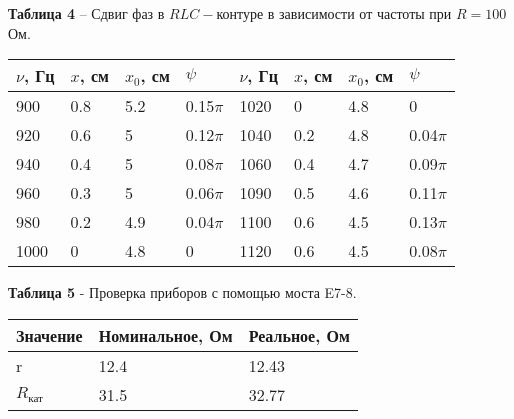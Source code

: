 \documentclass[12pt,a4paper]{article}
\begin{document}
\begin{itemize}
            \begin{table}[!h]
            \begin{flushleft}
           		\hspace{20}\textbf{Таблица 4} --  Сдвиг фаз в $RLC-$контуре в зависимости от частоты при $R = 100$ Ом.\\
            \end{flushleft}
                \begin{center}
                    \begin{tabular}{ | l | l | l | l | l | l | l | l |}
                        \hline
                        $\nu$, Гц   &   $x$, см &  $x_0$, см&   $\psi$  &   $\nu$, Гц   &   $x$, см &  $x_0$, см    &   $\psi$  \\
                        \hline
                        900     &   0.8 &   5.2 &   0.15$\pi$   &   1020    &   0   &   4.8 &   0           \\
                        920     &   0.6 &   5   &   0.12$\pi$   &   1040    &   0.2 &   4.8 &   0.04$\pi$  \\
                        940     &   0.4 &   5   &   0.08$\pi$   &   1060    &   0.4 &   4.7 &   0.09$\pi$  \\
                        960     &   0.3 &   5   &   0.06$\pi$   &   1090    &   0.5 &   4.6 &   0.11$\pi$   \\
                        980     &   0.2 &   4.9 &   0.04$\pi$   &   1100    &   0.6 &   4.5 &   0.13$\pi$   \\
                        1000    &   0   &   4.8 &   0           &   1120    &   0.6 &   4.5 &   0.08$\pi$   \\
                        \hline         
                    \end{tabular}
                \end{center}
            \end{table}
        \end{itemize}
    
        \begin{table}[!h]
            \begin{flushleft}
           		\hspace{87}\textbf{Таблица 5} - Проверка приборов с помощью моста E7-8.
            \end{flushleft}
            \begin{center}
                \begin{tabular}{ | l | l | l |}
                    \hline
                    Значение        &   Номинальное, Ом &   Реальное, Ом \\
                    \hline
                    r               &   12.4            &   12.43    \\
                    $R_\text{кат}$  &   31.5            &   32.77    \\
                    \hline                
                \end{tabular}
            \end{center}
        \end{table}
\end{document}
